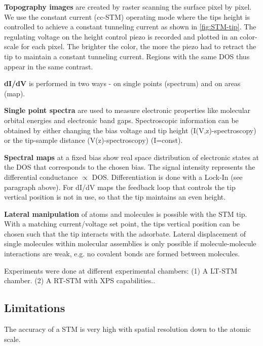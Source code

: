 \textbf{Topography images} are created by raster scanning the surface pixel by pixel. 
We use the constant current (cc-STM) operating mode where the tips height is controlled to achieve a constant tunneling current as shown in \autoref{fig:STM-tip}. The regulating voltage on the height control piezo is recorded and plotted in an color-scale for each pixel. The brighter the color, the more the piezo had to retract the tip to maintain a constant tunneling current. Regions with the same DOS thus appear in the same contrast.


\textbf{dI/dV} is performed in two ways - on single points (spectrum) and on areas (map). 

\textbf{Single point spectra} are used to measure electronic properties like molecular orbital energies and electronic band gaps.
Spectroscopic information can be obtained by either changing the bias voltage and tip height (I(V,z)-spectroscopy) or the tip-sample distance (V(z)-spectroscopy) (I=const).   

\textbf{Spectral maps} at a fixed bias show real space distribution of electronic states at the DOS that corresponds to the chosen bias. The signal intensity represents the differential conductance $\propto$ DOS. Differentiation is done with a Lock-In (see paragraph above). For dI/dV maps the feedback loop that controls the tip vertical position is not in use, so that the tip maintains an even height.

\textbf{Lateral manipulation} of atoms and molecules is possible with the STM tip. With a matching current/voltage set point, the tips vertical position can be chosen such that the tip interacts with the adsorbate. Lateral displacement of single molecules within molecular assemblies is only possible if molecule-molecule interactions are weak, e.g. no covalent bonds are formed between molecules. 

Experiments were done at different experimental chambers: 
(1) A LT-STM chamber.\cite{urgel_tendero_two-dimensional_2015, schwarz_assembly_2018, wiengarten_scanning_2015}
(2) A RT-STM with XPS capabilities.\cite{schwarz_assembly_2018}. 

\subsection{Limitations}

The accuracy of a STM is very high with spatial resolution down to the atomic scale.

